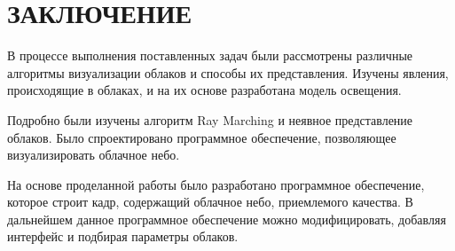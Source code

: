 \chapter*{ЗАКЛЮЧЕНИЕ}

В процессе выполнения поставленных задач были рассмотрены различные алгоритмы визуализации облаков и способы их представления. Изучены явления, происходящие в облаках, и на их основе разработана модель освещения. 

Подробно были изучены алгоритм Ray Marching и неявное представление облаков. Было спроектировано программное обеспечение, позволяющее визуализировать облачное небо.

На основе проделанной работы было разработано программное обеспечение, которое строит кадр, содержащий облачное небо, приемлемого качества. В дальнейшем данное программное обеспечение можно модифицировать, добавляя интерфейс и подбирая параметры облаков.